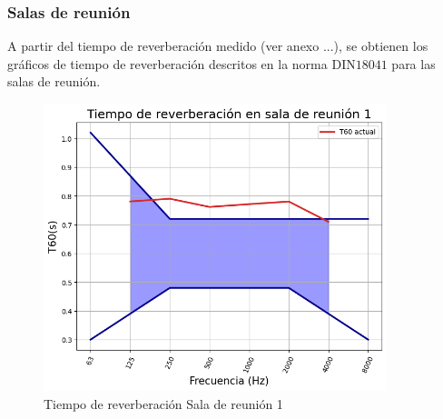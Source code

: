\subsubsection{Salas de reunión}
A partir del tiempo de reverberación medido (ver anexo ...), se obtienen los gráficos de tiempo de reverberación descritos en la norma DIN$18041$ para las salas de reunión.
    \begin{figure}[H]
        \centering
        \includegraphics[width=10cm]{Imagenes/DIN/DIN sala reunion 1 actual.png}
        \caption{Tiempo de reverberación Sala de reunión 1}
        \label{fig:Ttarget sala de reunion 1}
    \end{figure}

